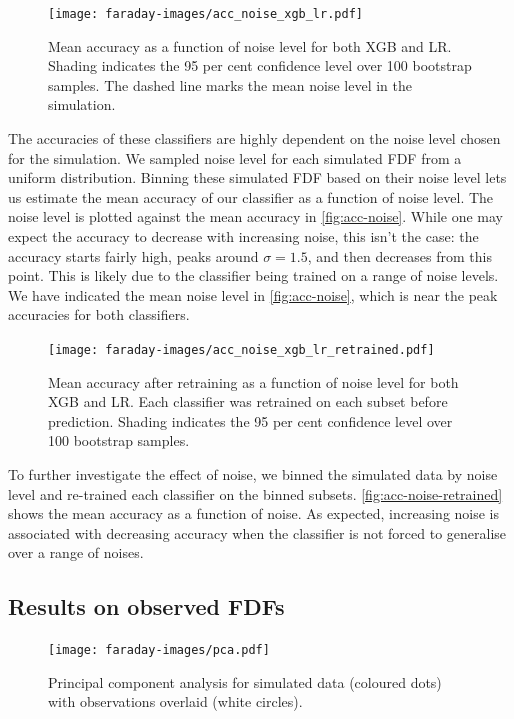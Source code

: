     \begin{figure}
      \texttt{[image: faraday-images/acc\_noise\_xgb\_lr.pdf]}
      \caption{\label{fig:faraday-acc-noise} Mean accuracy as a function of noise level for both XGB and LR. Shading indicates the 95 per cent confidence level over 100 bootstrap samples. The dashed line marks the mean noise level in the simulation.}
    \end{figure}

    The accuracies of these classifiers are highly dependent on the noise level chosen for the simulation. We sampled noise level for each simulated FDF from a uniform distribution. Binning these simulated FDF based on their noise level lets us estimate the mean accuracy of our classifier as a function of noise level. The noise level is plotted against the mean accuracy in \autoref{fig:acc-noise}. While one may expect the accuracy to decrease with increasing noise, this isn't the case: the accuracy starts fairly high, peaks around $\sigma = 1.5$, and then decreases from this point. This is likely due to the classifier being trained on a range of noise levels. We have indicated the mean noise level in \autoref{fig:acc-noise}, which is near the peak accuracies for both classifiers.

    \begin{figure}
      \texttt{[image: faraday-images/acc\_noise\_xgb\_lr\_retrained.pdf]}
      \caption{\label{fig:faraday-acc-noise-retrained} Mean accuracy after retraining as a function of noise level for both XGB and LR. Each classifier was retrained on each subset before prediction. Shading indicates the 95 per cent confidence level over 100 bootstrap samples.}
    \end{figure}

    To further investigate the effect of noise, we binned the simulated data by noise level and re-trained each classifier on the binned subsets. \autoref{fig:acc-noise-retrained} shows the mean accuracy as a function of noise. As expected, increasing noise is associated with decreasing accuracy when the classifier is not forced to generalise over a range of noises.

  \subsection{Results on observed FDFs}
  \label{sec:faraday-results-observed}

    \begin{figure}
      \centering
      \texttt{[image: faraday-images/pca.pdf]}
      \caption{Principal component analysis for simulated data (coloured dots) with observations overlaid (white circles).}
      \label{fig:faraday-pca}
    \end{figure}


